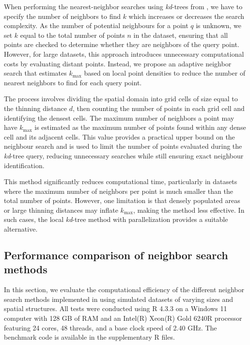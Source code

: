 When performing the nearest-neighbor searches using \emph{kd}-trees from , we have to specify the number of neighbors to find \(k\) which increases or decreases the search complexity. As the number of potential neighbours for a point \(q\) is unknown, we set \(k\) equal to the total number of points \(n\) in the dataset, ensuring that all points are checked to determine whether they are neighbors of the query point. However, for large datasets, this approach introduces unnecessary computational costs by evaluating distant points. Instead, we propose an adaptive neighbor search that estimates \(k_{\text{max}}\) based on local point densities to reduce the number of nearest neighbors to find for each query point.

The process involves dividing the spatial domain into grid cells of size equal to the thinning distance \(d\), then counting the number of points in each grid cell and identifying the densest cells. The maximum number of neighbors a point may have \(k_{\text{max}}\) is estimated as the maximum number of points found within any dense cell and its adjacent cells. This value provides a practical upper bound on the neighbour search and is used to limit the number of points evaluated during the \emph{kd}-tree query, reducing unnecessary searches while still ensuring exact neighbour identification.

This method significantly reduces computational time, particularly in datasets where the maximum number of neighbors per point is much smaller than the total number of points. However, one limitation is that densely populated areas or large thinning distances may inflate \(k_{\text{max}}\), making the method less effective. In such cases, the local \emph{kd}-tree method with parallelization provides a suitable alternative.

\subsection{Performance comparison of neighbor search methods}\label{performancesearchtype}

In this section, we evaluate the computational efficiency of the different neighbor search methods implemented in  using simulated datasets of varying sizes and spatial structures. All tests were conducted using R 4.3.3 on a Windows 11 computer with 128 GB of RAM and an Intel(R) Xeon(R) Gold 6240R processor featuring 24 cores, 48 threads, and a base clock speed of 2.40 GHz. The benchmark code is available in the supplementary R files.

